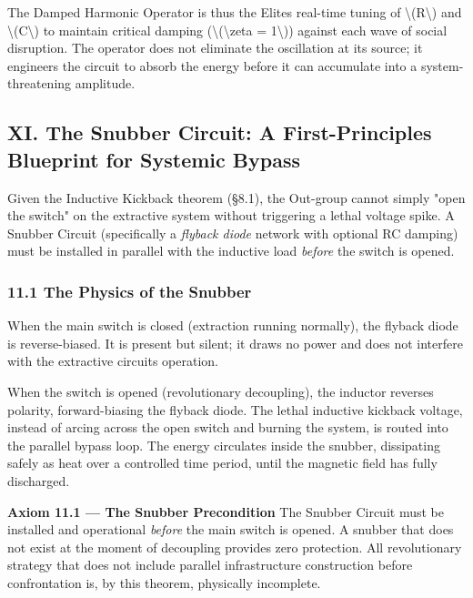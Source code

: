 {The Damped Harmonic Operator is thus the Elite\textquotesingle s
real-time tuning of \textbackslash(R\textbackslash) and
\textbackslash(C\textbackslash) to maintain critical damping
(\textbackslash(\textbackslash zeta = 1\textbackslash)) against each
wave of social disruption. The operator does not eliminate the
oscillation at its source; it engineers the circuit to absorb the energy
before it can accumulate into a system-threatening amplitude.

\protect{}\label{sec-snubber}
\subsection{XI. The Snubber Circuit: A First-Principles Blueprint for
Systemic
Bypass}\label{xi.-the-snubber-circuit-a-first-principles-blueprint-for-systemic-bypass}

Given the Inductive Kickback theorem (§8.1), the Out-group cannot simply
"open the switch" on the extractive system without triggering a lethal
voltage spike. A Snubber Circuit (specifically a \emph{flyback diode}
network with optional RC damping) must be installed in parallel with the
inductive load \emph{before} the switch is opened.

\subsubsection{11.1 The Physics of the
Snubber}\label{the-physics-of-the-snubber}

When the main switch is closed (extraction running normally), the
flyback diode is reverse-biased. It is present but silent; it draws no
power and does not interfere with the extractive
circuit\textquotesingle s operation.

When the switch is opened (revolutionary decoupling), the inductor
reverses polarity, forward-biasing the flyback diode. The lethal
inductive kickback voltage, instead of arcing across the open switch and
burning the system, is routed into the parallel bypass loop. The energy
circulates inside the snubber, dissipating safely as heat over a
controlled time period, until the magnetic field has fully discharged.

\textbf{Axiom 11.1 --- The Snubber Precondition} The Snubber Circuit
must be installed and operational \emph{before} the main switch is
opened. A snubber that does not exist at the moment of decoupling
provides zero protection. All revolutionary strategy that does not
include parallel infrastructure construction before confrontation is, by
this theorem, physically incomplete.

}
